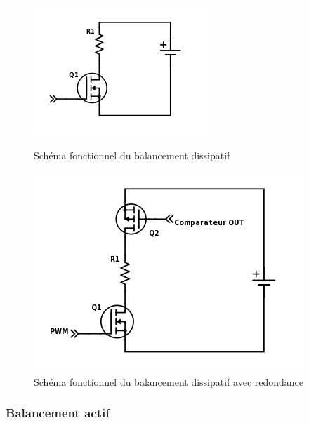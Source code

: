 \begin{figure}[H]
	\begin{minipage}{0.5\textwidth}
		\centering
		\includegraphics[scale=0.9]{Images/Dissipative_balancing.png}
		\caption{Schéma fonctionnel du balancement dissipatif}
		\label{fig:bal_dis}
	\end{minipage}
	\hfill
	\begin{minipage}{0.45\textwidth}
		\centering
		\includegraphics[scale=0.6]{Images/Dissipative_bal_comp.png}
		\caption{Schéma fonctionnel du balancement dissipatif avec redondance}
		\label{fig:bal_dis_comp}
	\end{minipage}	
\end{figure}

\subsubsection*{Balancement actif}
\paragraph*{}




